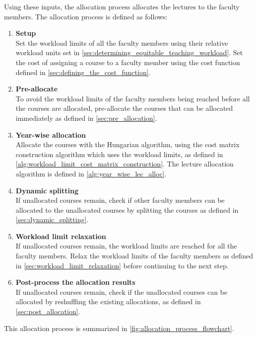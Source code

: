 Using these inputs, the allocation process allocates the lectures to the faculty members. The allocation process is defined as follows:

\begin{enumerate}
  \item \textbf{Setup}\\
        Set the workload limits of all the faculty members using their relative workload units set in \autoref{sec:determining_equitable_teaching_workload}. Set the cost of assigning a course to a faculty member using the cost function defined in \autoref{sec:defining_the_cost_function}.
  \item \textbf{Pre-allocate}\\
        To avoid the workload limits of the faculty members being reached before all the courses are allocated, pre-allocate the courses that can be allocated immediately as defined in \autoref{sec:pre_allocation}.
  \item \textbf{Year-wise allocation}\\
        Allocate the courses with the Hungarian algorithm, using the cost matrix construction algorithm which uses the workload limits, as defined in \autoref{alg:workload_limit_cost_matrix_construction}. The lecture allocation algorithm is defined in \autoref{alg:year_wise_lec_alloc}.
  \item \textbf{Dynamic splitting}\\
        If unallocated courses remain, check if other faculty members can be allocated to the unallocated courses by splitting the courses as defined in \autoref{sec:dynamic_splitting}.
  \item \textbf{Workload limit relaxation}\\
        If unallocated courses remain, the workload limits are reached for all the faculty members. Relax the workload limits of the faculty members as defined in \autoref{sec:workload_limit_relaxation} before continuing to the next step.
  \item \textbf{Post-process the allocation results}\\
        If unallocated courses remain, check if the unallocated courses can be allocated by reshuffling the existing allocations, as defined in \autoref{sec:post_allocation}.
\end{enumerate}

This allocation process is summarized in \autoref{fig:allocation_process_flowchart}.

